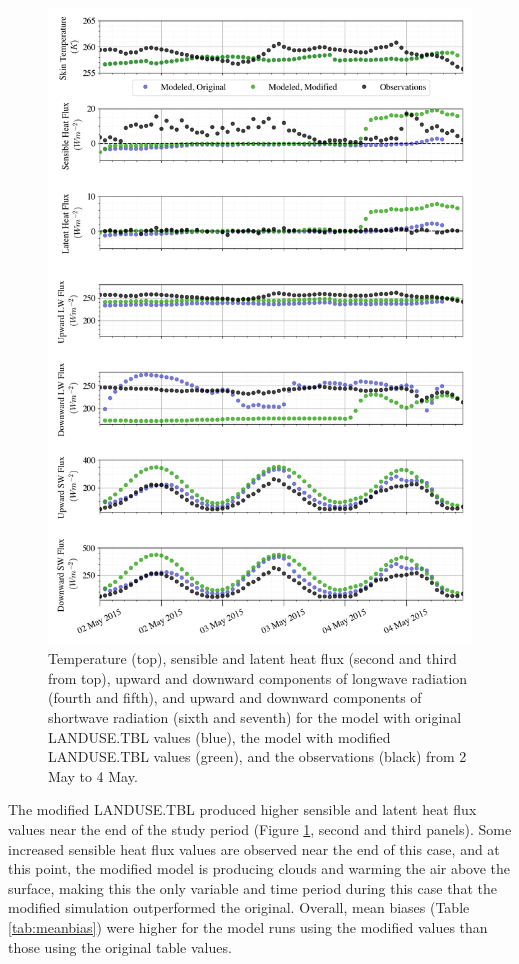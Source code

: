 \begin{figure}[p]
    \centering
    \vspace*{-2cm}
    \includegraphics[width=0.9\linewidth]{figures/chapter6/case2_all_new.png}
    \caption[Idealized Case 2]{Temperature (top), sensible and latent heat flux (second and third from top), upward and downward components of longwave radiation (fourth and fifth), and upward and downward components of shortwave radiation (sixth and seventh) for the model with original LANDUSE.TBL values (blue), the model with modified LANDUSE.TBL values (green), and the observations (black) from 2 May to 4 May.}
    \label{fig:c2}
\end{figure}

The modified LANDUSE.TBL produced higher sensible and latent heat flux values near the end of the study period (Figure \ref{fig:c2}, second and third panels). Some increased sensible heat flux values are observed near the end of this case, and at this point, the modified model is producing clouds and warming the air above the surface, making this the only variable and time period during this case that the modified simulation outperformed the original. Overall, mean biases (Table \ref{tab:meanbias}) were higher for the model runs using the modified values than those using the original table values.

